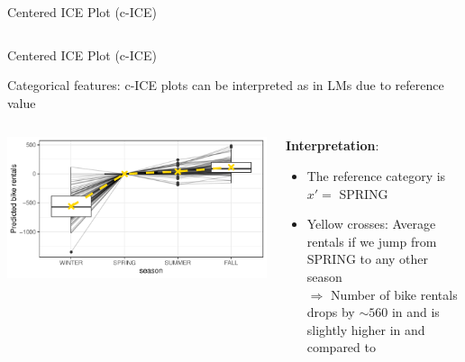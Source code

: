 \documentclass[10pt,compress,t,notes=noshow, xcolor=table]{beamer}
\begin{document}
\begin{frame}{Centered ICE Plot (c-ICE) }
\begin{columns}[c, totalwidth=\textwidth]
\begin{column}{0.5\textwidth}
\begin{center}
\end{center}
\end{column}
\end{columns}


\end{frame}


\begin{frame}{Centered ICE Plot (c-ICE)}

Categorical features: c-ICE plots can be interpreted as in LMs due to reference value

\begin{columns}[c, totalwidth=\textwidth]
\begin{column}{0.4\textwidth}

\begin{center}
\includegraphics[width=\textwidth]{figure/cICEcat}
\end{center}

\end{column}
\begin{column}{0.6\textwidth}

\textbf{Interpretation}: \\
\begin{itemize}
\item The reference category is $x' =$ SPRING
\item Yellow crosses: Average rentals if we jump from SPRING to any other season\\
$\Rightarrow$ Number of bike rentals drops by $\sim 560$ in  and is slightly higher in  and  compared to 
\end{itemize}

\end{column}
\end{columns}

\end{frame}


\endlecture
\end{document}

